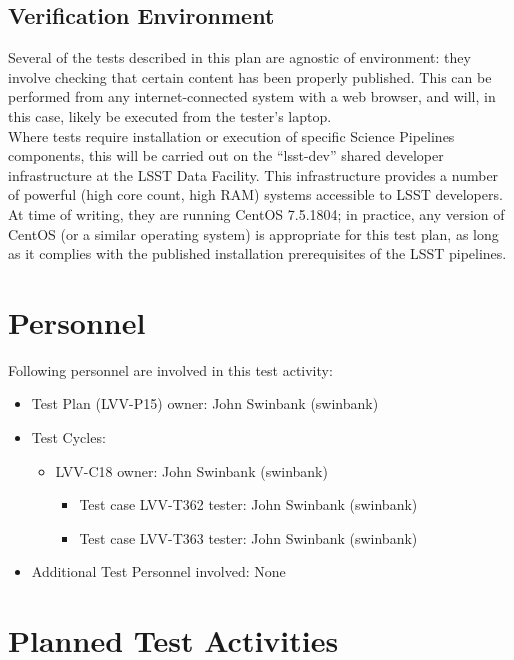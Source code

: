 \documentclass[DM,lsstdraft,STR,toc]{lsstdoc}
\begin{document}
\subsection{Verification Environment}
\label{sect:hwconf}
Several of the tests described in this plan are agnostic of environment:
they involve checking that certain content has been properly published.
This can be performed from any internet-connected system with a web
browser, and will, in this case, likely be executed from the tester's
laptop.\\[2\baselineskip]Where tests require installation or execution
of specific Science Pipelines components, this will be carried out on
the ``lsst-dev'' shared developer infrastructure at the LSST Data
Facility. This infrastructure provides a number of powerful (high core
count, high RAM) systems accessible to LSST developers. At time of
writing, they are running CentOS 7.5.1804; in practice, any version of
CentOS (or a similar operating system) is appropriate for this test
plan, as long as it complies with the published installation
prerequisites of the LSST pipelines.\\[2\baselineskip]





\section{Personnel}
\label{sect:personnel}

Following personnel are involved in this test activity:

\begin{itemize}
\item Test Plan (LVV-P15) owner: John Swinbank (swinbank)
\item Test Cycles:
\begin{itemize}
  \item LVV-C18 owner: 
John Swinbank (swinbank)
  \begin{itemize}
    \item Test case LVV-T362 tester: John Swinbank (swinbank)
    \item Test case LVV-T363 tester: John Swinbank (swinbank)
  \end{itemize}
\end{itemize}
\item Additional Test Personnel involved: None
\end{itemize}

\newpage
\section{Planned Test Activities}
\label{sect:plannedtestactivities}
\end{document}
